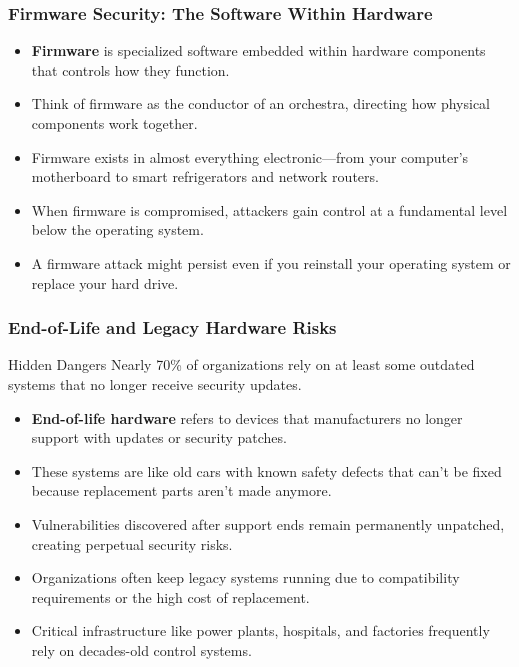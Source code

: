\documentclass{beamer}
\begin{document}
\begin{frame}
    \frametitle{Firmware Security: The Software Within Hardware}
    
    \begin{itemize}
        \item \textbf{Firmware} is specialized software embedded within hardware components that controls how they function.
        \item Think of firmware as the conductor of an orchestra, directing how physical components work together.
        \item Firmware exists in almost everything electronic—from your computer's motherboard to smart refrigerators and network routers.
        \item When firmware is compromised, attackers gain control at a fundamental level below the operating system.
        \item A firmware attack might persist even if you reinstall your operating system or replace your hard drive.
    \end{itemize}
\end{frame}

\begin{frame}
    \frametitle{End-of-Life and Legacy Hardware Risks}
    
    \begin{alertblock}{Hidden Dangers}
        Nearly 70\% of organizations rely on at least some outdated systems that no longer receive security updates.
    \end{alertblock}
    
    \begin{itemize}
        \item \textbf{End-of-life hardware} refers to devices that manufacturers no longer support with updates or security patches.
        \item These systems are like old cars with known safety defects that can't be fixed because replacement parts aren't made anymore.
        \item Vulnerabilities discovered after support ends remain permanently unpatched, creating perpetual security risks.
        \item Organizations often keep legacy systems running due to compatibility requirements or the high cost of replacement.
        \item Critical infrastructure like power plants, hospitals, and factories frequently rely on decades-old control systems.
    \end{itemize}
\end{frame}
\end{document}
